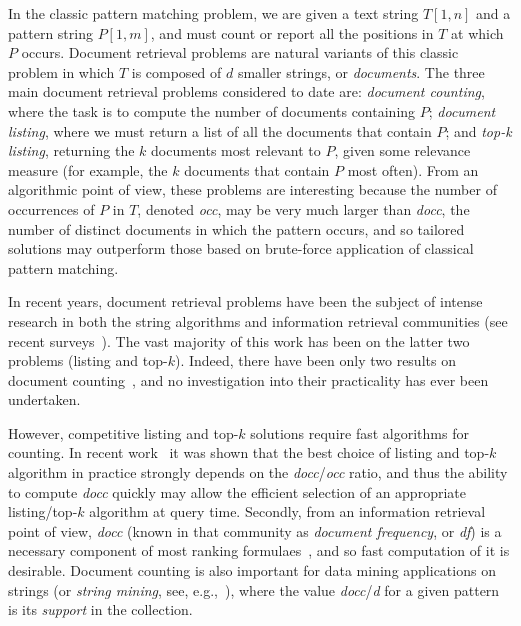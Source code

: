 \documentclass[11pt]{llncs}
\begin{document}
In the classic pattern matching problem, we are given a text string $T[1,n]$ and a pattern string $P[1,m]$,
and must count or report all the positions in $T$ at which $P$ occurs.
Document retrieval problems are natural variants of this classic problem in which $T$ is composed of $d$ 
smaller strings, or {\em documents}.
The three main document retrieval problems considered to date are: {\em document counting}, 
where the task is to compute the number of documents containing $P$; {\em document listing}, where 
we must return a list of all the documents that contain $P$; and {\em top-k listing}, returning the $k$ 
documents most relevant to $P$, given some relevance measure (for example, the $k$ documents that 
contain $P$ most often). From an algorithmic point of view, these problems are interesting because
the number of occurrences of $P$ in $T$, denoted {\em occ}, may be very much larger than {\em docc}, 
the number of distinct documents in which the pattern occurs, and so tailored solutions may outperform
those based on brute-force application of classical pattern matching. 

In recent years, document retrieval problems have been the subject of intense research in both the
string algorithms and information retrieval communities (see recent surveys~\cite{HPSTV13,NavACMcs14}). The vast majority of this work has been on the latter two problems (listing and top-$k$). 
Indeed, there have been only two results on document counting~\cite{Sad07,GKNPS13}, and no investigation 
into their practicality has ever been undertaken.

However, competitive listing and top-$k$ solutions require fast algorithms for
counting. In recent work~\cite{NPS2014} it was shown that the best choice of listing and top-$k$ algorithm in 
practice strongly depends on the {\em docc}/{\em occ} ratio, and thus the ability to compute {\em docc} quickly 
may allow the efficient selection of an appropriate listing/top-$k$ algorithm at query time. Secondly, 
from an information retrieval point of view, {\em docc} (known in that community as {\em document frequency}, 
or {\em df}) is a necessary component of most ranking formulaes~\cite{ZM1998,BCC10,CMS09}, and so 
fast computation of it is desirable. Document counting is also important for data mining applications on strings 
(or {\em string mining}, see, e.g.,~\cite{FMV2008,DPT2012}), where the value {\em docc}/{\em d} for a 
given pattern is its {\em support} in the collection.
\end{document}
